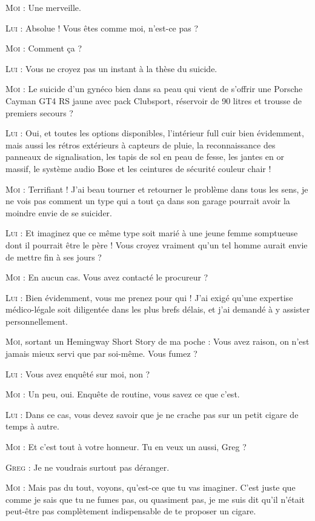 \begin{dialogue}
\textsc{Moi} : Une merveille.

\textsc{Lui} : Absolue ! Vous êtes comme moi, n’est-ce pas ?

\textsc{Moi} : Comment ça ?

\textsc{Lui} : Vous ne croyez pas un instant à la thèse du suicide.

\textsc{Moi} : Le suicide d’un gynéco bien dans sa peau qui vient de s’offrir une Porsche Cayman GT4 RS jaune avec pack Clubsport, réservoir de 90 litres et trousse de premiers secours ?

\textsc{Lui} : Oui, et toutes les options disponibles, l’intérieur full cuir bien évidemment, mais aussi les rétros extérieurs à capteurs de pluie, la reconnaissance des panneaux de signalisation, les tapis de sol en peau de fesse, les jantes en or massif, le système audio Bose et les ceintures de sécurité couleur chair !

\textsc{Moi} : Terrifiant ! J’ai beau tourner et retourner le problème dans tous les sens, je ne vois pas comment un type qui a tout ça dans son garage pourrait avoir la moindre envie de se suicider.

\textsc{Lui} : Et imaginez que ce même type soit marié à une jeune femme somptueuse dont il pourrait être le père ! Vous croyez vraiment qu’un tel homme aurait envie de mettre fin à ses jours ?

\textsc{Moi} : En aucun cas. Vous avez contacté le procureur ?

\textsc{Lui} : Bien évidemment, vous me prenez pour qui ! J’ai exigé qu’une expertise médico-légale soit diligentée dans les plus brefs délais, et j’ai demandé à y assister personnellement.

\textsc{Moi}, sortant un Hemingway Short Story de ma poche : Vous avez raison, on n’est jamais mieux servi que par soi-même. Vous fumez ?

\textsc{Lui} : Vous avez enquêté sur moi, non ?

\textsc{Moi} : Un peu, oui. Enquête de routine, vous savez ce que c’est.

\textsc{Lui} : Dans ce cas, vous devez savoir que je ne crache pas sur un petit cigare de temps à autre.

\textsc{Moi} : Et c’est tout à votre honneur. Tu en veux un aussi, Greg ?

\textsc{Greg} : Je ne voudrais surtout pas déranger.

\textsc{Moi} : Mais pas du tout, voyons, qu’est-ce que tu vas imaginer. C’est juste que comme je sais que tu ne fumes pas, ou quasiment pas, je me suis dit qu’il n’était peut-être pas complètement indispensable de te proposer un cigare.


\end{dialogue}
